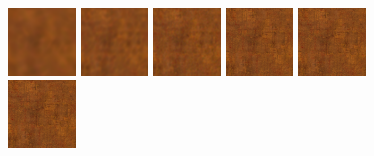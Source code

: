 \begin{figure}[!h]
\includegraphics[width=0.16\textwidth]{img/ch6/copper/detail1.png}
\includegraphics[width=0.16\textwidth]{img/ch6/copper/detail2.png}
\includegraphics[width=0.16\textwidth]{img/ch6/copper/detail3.png}
\includegraphics[width=0.16\textwidth]{img/ch6/copper/detail4.png}
\includegraphics[width=0.16\textwidth]{img/ch6/copper/detail5.png}
\includegraphics[width=0.16\textwidth]{img/ch6/copper/detail6.png}


\end{figure}
